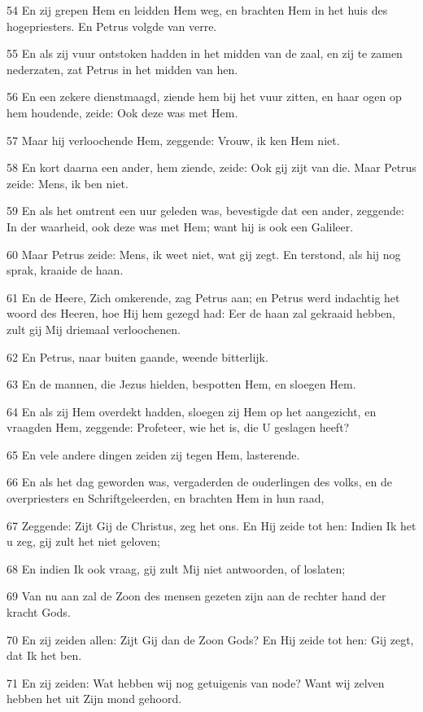 \par 54 En zij grepen Hem en leidden Hem weg, en brachten Hem in het huis des hogepriesters. En Petrus volgde van verre.
\par 55 En als zij vuur ontstoken hadden in het midden van de zaal, en zij te zamen nederzaten, zat Petrus in het midden van hen.
\par 56 En een zekere dienstmaagd, ziende hem bij het vuur zitten, en haar ogen op hem houdende, zeide: Ook deze was met Hem.
\par 57 Maar hij verloochende Hem, zeggende: Vrouw, ik ken Hem niet.
\par 58 En kort daarna een ander, hem ziende, zeide: Ook gij zijt van die. Maar Petrus zeide: Mens, ik ben niet.
\par 59 En als het omtrent een uur geleden was, bevestigde dat een ander, zeggende: In der waarheid, ook deze was met Hem; want hij is ook een Galileer.
\par 60 Maar Petrus zeide: Mens, ik weet niet, wat gij zegt. En terstond, als hij nog sprak, kraaide de haan.
\par 61 En de Heere, Zich omkerende, zag Petrus aan; en Petrus werd indachtig het woord des Heeren, hoe Hij hem gezegd had: Eer de haan zal gekraaid hebben, zult gij Mij driemaal verloochenen.
\par 62 En Petrus, naar buiten gaande, weende bitterlijk.
\par 63 En de mannen, die Jezus hielden, bespotten Hem, en sloegen Hem.
\par 64 En als zij Hem overdekt hadden, sloegen zij Hem op het aangezicht, en vraagden Hem, zeggende: Profeteer, wie het is, die U geslagen heeft?
\par 65 En vele andere dingen zeiden zij tegen Hem, lasterende.
\par 66 En als het dag geworden was, vergaderden de ouderlingen des volks, en de overpriesters en Schriftgeleerden, en brachten Hem in hun raad,
\par 67 Zeggende: Zijt Gij de Christus, zeg het ons. En Hij zeide tot hen: Indien Ik het u zeg, gij zult het niet geloven;
\par 68 En indien Ik ook vraag, gij zult Mij niet antwoorden, of loslaten;
\par 69 Van nu aan zal de Zoon des mensen gezeten zijn aan de rechter hand der kracht Gods.
\par 70 En zij zeiden allen: Zijt Gij dan de Zoon Gods? En Hij zeide tot hen: Gij zegt, dat Ik het ben.
\par 71 En zij zeiden: Wat hebben wij nog getuigenis van node? Want wij zelven hebben het uit Zijn mond gehoord.

